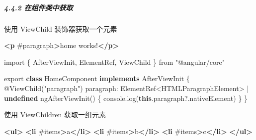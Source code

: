 \documentclass[
]{article}
\newenvironment{Shaded}{}{}
\newcommand{\AttributeTok}[1]{\textcolor[rgb]{0.49,0.56,0.16}{#1}}
\newcommand{\BuiltInTok}[1]{#1}
\newcommand{\DataTypeTok}[1]{\textcolor[rgb]{0.56,0.13,0.00}{#1}}
\newcommand{\FunctionTok}[1]{\textcolor[rgb]{0.02,0.16,0.49}{#1}}
\newcommand{\ImportTok}[1]{#1}
\newcommand{\KeywordTok}[1]{\textcolor[rgb]{0.00,0.44,0.13}{\textbf{#1}}}
\newcommand{\NormalTok}[1]{#1}
\newcommand{\OperatorTok}[1]{\textcolor[rgb]{0.40,0.40,0.40}{#1}}
\newcommand{\OtherTok}[1]{\textcolor[rgb]{0.00,0.44,0.13}{#1}}
\newcommand{\StringTok}[1]{\textcolor[rgb]{0.25,0.44,0.63}{#1}}
\begin{document}
\hypertarget{442-ux5728ux7ec4ux4ef6ux7c7bux4e2dux83b7ux53d6}{%
\subparagraph{4.4.2
在组件类中获取}\label{442-ux5728ux7ec4ux4ef6ux7c7bux4e2dux83b7ux53d6}}

使用 ViewChild 装饰器获取一个元素

\begin{Shaded}
\begin{Highlighting}[]
\KeywordTok{\textless{}p}\OtherTok{ \#paragraph}\KeywordTok{\textgreater{}}\NormalTok{home works!}\KeywordTok{\textless{}/p\textgreater{}}
\end{Highlighting}
\end{Shaded}

\begin{Shaded}
\begin{Highlighting}[]
\ImportTok{import}\NormalTok{ \{ AfterViewInit}\OperatorTok{,}\NormalTok{ ElementRef}\OperatorTok{,}\NormalTok{ ViewChild \} }\ImportTok{from} \StringTok{"@angular/core"}

\ImportTok{export} \KeywordTok{class}\NormalTok{ HomeComponent }\KeywordTok{implements}\NormalTok{ AfterViewInit \{}
\NormalTok{  @}\FunctionTok{ViewChild}\NormalTok{(}\StringTok{"paragraph"}\NormalTok{) }\DataTypeTok{paragraph}\OperatorTok{:}\NormalTok{ ElementRef}\OperatorTok{\textless{}}\BuiltInTok{HTMLParagraphElement}\OperatorTok{\textgreater{}} \OperatorTok{|} \KeywordTok{undefined}
  \FunctionTok{ngAfterViewInit}\NormalTok{() \{}
    \BuiltInTok{console}\OperatorTok{.}\FunctionTok{log}\NormalTok{(}\KeywordTok{this}\OperatorTok{.}\AttributeTok{paragraph}\OperatorTok{?.}\AttributeTok{nativeElement}\NormalTok{)}
\NormalTok{  \}}
\NormalTok{\}}
\end{Highlighting}
\end{Shaded}

使用 ViewChildren 获取一组元素

\begin{Shaded}
\begin{Highlighting}[]
\KeywordTok{\textless{}ul\textgreater{}}
  \KeywordTok{\textless{}li}\OtherTok{ \#items}\KeywordTok{\textgreater{}}\NormalTok{a}\KeywordTok{\textless{}/li\textgreater{}}
  \KeywordTok{\textless{}li}\OtherTok{ \#items}\KeywordTok{\textgreater{}}\NormalTok{b}\KeywordTok{\textless{}/li\textgreater{}}
  \KeywordTok{\textless{}li}\OtherTok{ \#items}\KeywordTok{\textgreater{}}\NormalTok{c}\KeywordTok{\textless{}/li\textgreater{}}
\KeywordTok{\textless{}/ul\textgreater{}}
\end{Highlighting}
\end{Shaded}
\end{document}

